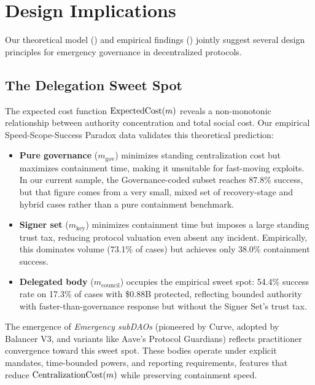 \documentclass[12pt]{article}
\begin{document}
\fi


\section{Design Implications}
\label{sec:implications}

Our theoretical model () and empirical findings () jointly suggest several design principles for emergency governance in decentralized protocols.


\subsection{The Delegation Sweet Spot}
\label{subsec:delegation}

The expected cost function $\mathrm{ExpectedCost}(m)$ reveals a non-monotonic relationship between authority concentration and total social cost. Our empirical Speed-Scope-Success Paradox data validates this theoretical prediction:

\begin{itemize}
    \item \textbf{Pure governance} ($m_{\text{gov}}$) minimizes standing centralization cost but maximizes containment time, making it unsuitable for fast-moving exploits. In our current sample, the Governance-coded subset reaches 87.8\% success, but that figure comes from a very small, mixed set of recovery-stage and hybrid cases rather than a pure containment benchmark.
    \item \textbf{Signer set} ($m_{\text{key}}$) minimizes containment time but imposes a large standing trust tax, reducing protocol valuation even absent any incident. Empirically, this dominates volume (73.1\% of cases) but achieves only 38.0\% containment success.
    \item \textbf{Delegated body} ($m_{\text{council}}$) occupies the empirical sweet spot: 54.4\% success rate on 17.3\% of cases with \$0.88B protected, reflecting bounded authority with faster-than-governance response but without the Signer Set's trust tax.
\end{itemize}

The emergence of \emph{Emergency subDAOs} (pioneered by Curve, adopted by Balancer V3, and variants like Aave's Protocol Guardians) reflects practitioner convergence toward this sweet spot.
These bodies operate under explicit mandates, time-bounded powers, and reporting requirements, features that reduce $\mathrm{CentralizationCost}(m)$ while preserving containment speed.
\end{document}
